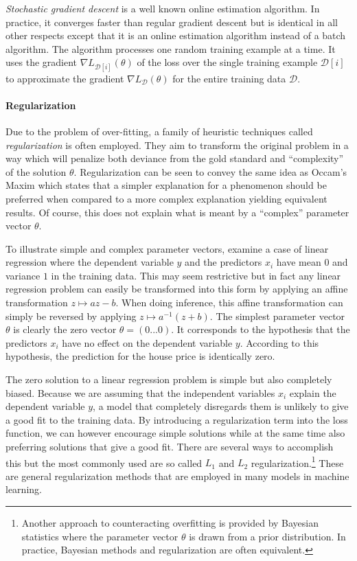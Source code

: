 {\it Stochastic gradient descent} is a well known online estimation
algorithm. In practice, it converges faster than regular gradient
descent \cite{someone} but is identical in all other respects except
that it is an online estimation algorithm instead of a batch
algorithm. The algorithm processes one random training example at a
time. It uses the gradient $\nabla L_{\mathcal{D}[i]}(\theta)$ of the
loss over the single training example $\mathcal{D}[i]$ to approximate
the gradient $\nabla L_{\mathcal{D}}(\theta)$ for the entire training
data $\mathcal{D}$. 


\paragraph{Regularization} Due to the problem of over-fitting, a
family of heuristic techniques called {\it regularization} is often
employed. They aim to transform the original problem in a way which
will penalize both deviance from the gold standard and ``complexity''
of the solution $\theta$. Regularization can be seen to convey the
same idea as Occam's Maxim which states that a simpler explanation for
a phenomenon should be preferred when compared to a more complex
explanation yielding equivalent results. Of course, this does not
explain what is meant by a ``complex'' parameter vector
$\theta$.

To illustrate simple and complex parameter vectors, examine a case of
linear regression where the dependent variable $y$ and the predictors
$x_i$ have mean $0$ and variance $1$ in the training data. This may
seem restrictive but in fact any linear regression problem can easily
be transformed into this form by applying an affine transformation $z
\mapsto az - b$. When doing inference, this affine transformation can
simply be reversed by applying $z \mapsto a^{-1} (z + b)$. The
simplest parameter vector $\theta$ is clearly the zero vector $\theta
= (0 ... 0)$. It corresponds to the hypothesis that the
predictors $x_i$ have no effect on the dependent variable
$y$. According to this hypothesis, the prediction for the house price
is identically zero.

The zero solution to a linear regression problem is simple but also
completely biased. Because we are assuming that the independent
variables $x_i$ explain the dependent variable $y$, a model that
completely disregards them is unlikely to give a good fit to the
training data. By introducing a regularization term into the loss
function, we can however encourage simple solutions while at the same
time also preferring solutions that give a good fit. There are several
ways to accomplish this but the most commonly used are so called $L_1$
and $L_2$ regularization.\footnote{Another approach to counteracting
  overfitting is provided by Bayesian statistics where the parameter
  vector $\theta$ is drawn from a prior distribution. In practice,
  Bayesian methods and regularization are often equivalent.} These are
general regularization methods that are employed in many models in
machine learning.

